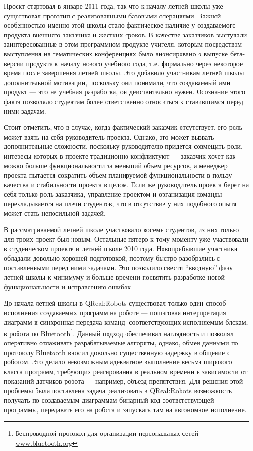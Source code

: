\documentclass[a4paper]{article}
\begin{document}
Проект стартовал в январе 2011 года, так что к началу летней школы уже существовал прототип с реализованными базовыми операциями. Важной особенностью именно этой школы стало фактическое наличие у создаваемого продукта внешнего заказчика и жестких сроков. В качестве заказчиков выступали заинтересованные в этом программном продукте учителя, которым посредством выступления на тематических конференциях было анонсировано о выпуске бета-версии продукта к началу нового учебного года, т.е. формально через некоторое время после завершения летней школы. Это добавило участникам летней школы дополнительной мотивации, поскольку они понимали, что создаваемый ими продукт --- это не учебная разработка, он действительно нужен. Осознание этого факта позволяло студентам более ответственно относиться к ставившимся перед ними задачам. 

Стоит отметить, что в случае, когда фактический заказчик отсутствует, его роль может взять на себя руководитель проекта. Однако, это может вызвать дополнительные сложности, поскольку руководителю придется совмещать роли, интересы которых в проекте традиционно конфликтуют --- заказчик хочет как можно больше функциональности за меньший объем ресурсов, а менеджер проекта пытается сократить объем планируемой функциональности в пользу качества и стабильности проекта в целом. Если же руководитель проекта берет на себя только роль заказчика, управление проектом и организация команды перекладывается на плечи студентов, что в отсутствие у них подобного опыта может стать непосильной задачей.

В рассматриваемой летней школе участвовало восемь студентов, из них только для троих проект был новым. Остальные пятеро к тому моменту уже участвовали в студенческом проекте и летней школе 2010 года. Новоприбывшие участники обладали довольно хорошей подготовкой, поэтому быстро разобрались с поставленными перед ними задачами. Это позволило свести ``вводную'' фазу летней школы к минимуму и больше времени посвятить разработке новой функциональности и исправлению ошибок. 

До начала летней школы в QReal:Robots существовал только один способ исполнения создаваемых программ на роботе --- пошаговая интерпретация диаграмм и синхронная передача команд, соответствующих исполняемым блокам, в робота по Bluetooth\footnote{Беспроводной протокол для организации персональных сетей, \url{www.bluetooth.org}}. Данный подход обеспечивал наглядность и позволял оперативно отлаживать разрабатываемые алгориты, однако, обмен данными по протоколу Bluetooth вносил довольно существенную задержку в общение с роботом. Это делало невозможным адекватное выполнение весьма широкого класса программ, требующих реагирования в реальном времени в зависимости от показаний датчиков робота --- например, объезд препятствия. Для решения этой проблемы была поставлена задача реализовать в QReal:Robots возможность получать по создаваемым диаграммам бинарный код соответствующей программы, передавать его на робота и запускать там на автономное исполнение.
\end{document}
